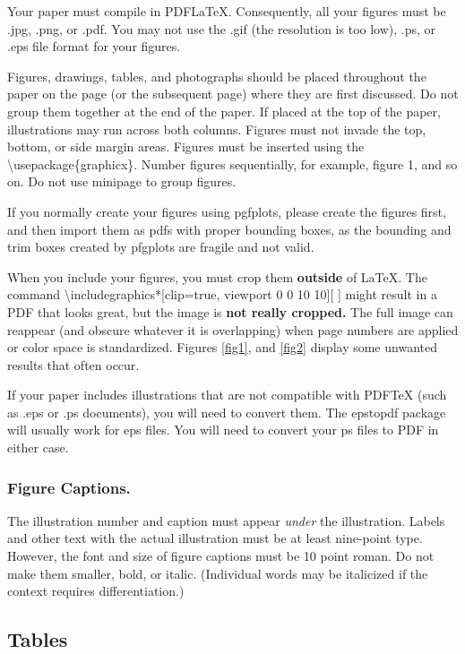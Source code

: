 Your paper must compile in PDF\LaTeX{}. Consequently, all your figures
must be .jpg, .png, or .pdf. You may not use the .gif (the resolution is
too low), .ps, or .eps file format for your figures.

Figures, drawings, tables, and photographs should be placed throughout
the paper on the page (or the subsequent page) where they are first
discussed. Do not group them together at the end of the paper. If placed
at the top of the paper, illustrations may run across both columns.
Figures must not invade the top, bottom, or side margin areas. Figures
must be inserted using the \textbackslash usepackage\{graphicx\}. Number
figures sequentially, for example, figure 1, and so on. Do not use
minipage to group figures.

If you normally create your figures using pgfplots, please create the
figures first, and then import them as pdfs with proper bounding boxes,
as the bounding and trim boxes created by pfgplots are fragile and not
valid.

When you include your figures, you must crop them \textbf{outside} of
\LaTeX{}. The command \textbackslash includegraphics*{[}clip=true,
viewport 0 0 10 10{]}{[}{} {]} might result in a PDF that looks great,
but the image is \textbf{not really cropped.} The full image can
reappear (and obscure whatever it is overlapping) when page numbers are
applied or color space is standardized. Figures \ref{fig1}, and
\ref{fig2} display some unwanted results that often occur.

If your paper includes illustrations that are not compatible with
PDF\TeX{} (such as .eps or .ps documents), you will need to convert
them. The epstopdf package will usually work for eps files. You will
need to convert your ps files to PDF in either case.

\subsubsection {Figure Captions.}

The illustration number and caption must appear \textit{under} the
illustration. Labels and other text with the actual illustration must be
at least nine-point type. However, the font and size of figure captions
must be 10 point roman. Do not make them smaller, bold, or italic.
(Individual words may be italicized if the context requires
differentiation.)

\subsection{Tables}

